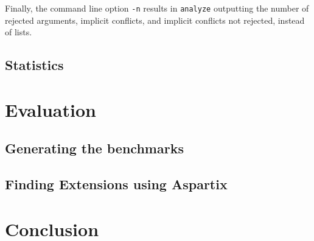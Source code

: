 \documentclass{scrartcl}
\begin{document}
Finally, the command line option \texttt{-n} results in \texttt{analyze} outputting the number
of rejected arguments, implicit conflicts, and implicit conflicts not rejected, instead
of lists.

\subsection{Statistics}

\section{Evaluation}
\label{evaluation}
\subsection{Generating the benchmarks}
\subsection{Finding Extensions using Aspartix}

\section{Conclusion}
\label{conclusion}

\printbibliography
\end{document}
